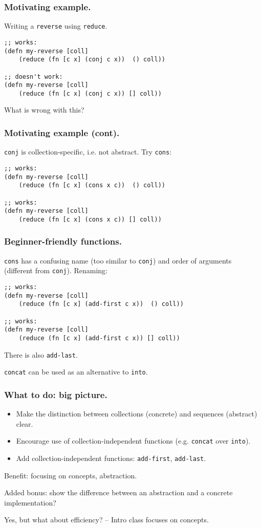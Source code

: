 \documentclass{beamer}
\begin{document}
\begin{frame}[fragile]
  \frametitle{Motivating example.}
Writing a {\tt reverse} using {\tt reduce}. 
\begin{verbatim}
;; works:
(defn my-reverse [coll]
    (reduce (fn [c x] (conj c x))  () coll)) 

;; doesn't work:
(defn my-reverse [coll]
    (reduce (fn [c x] (conj c x)) [] coll)) 
\end{verbatim}
What is wrong with this?
\end{frame}

\begin{frame}[fragile]
  \frametitle{Motivating example (cont).}
{\tt conj} is collection-specific, i.e. not abstract. Try {\tt cons}:

\begin{verbatim}
;; works:
(defn my-reverse [coll]
    (reduce (fn [c x] (cons x c))  () coll)) 

;; works:
(defn my-reverse [coll]
    (reduce (fn [c x] (cons x c)) [] coll)) 
\end{verbatim}


\end{frame}

\begin{frame}[fragile]
  \frametitle{Beginner-friendly functions.}
{\tt cons} has a confusing name (too similar to {\tt conj}) and order of arguments (different from {\tt conj}). Renaming: 

\begin{verbatim}
;; works:
(defn my-reverse [coll]
    (reduce (fn [c x] (add-first c x))  () coll)) 

;; works:
(defn my-reverse [coll]
    (reduce (fn [c x] (add-first c x)) [] coll)) 
\end{verbatim}
There is also {\tt add-last}.

{\tt concat} can be used as an alternative to {\tt into}.
\end{frame}


\begin{frame}[fragile]
  \frametitle{What to do: big picture.}
\begin{itemize}
\item Make the distinction between collections (concrete) and sequences (abstract) clear. 
\item Encourage use of collection-independent functions (e.g. {\tt concat} over {\tt into}).
\item Add collection-independent functions: {\tt add-first}, {\tt add-last}.
\end{itemize}
Benefit: focusing on concepts, abstraction. 

Added bonus: show the difference between an abstraction and a concrete implementation?

Yes, but what about efficiency? -- Intro class focuses on concepts. 
\end{frame}
\end{document}
